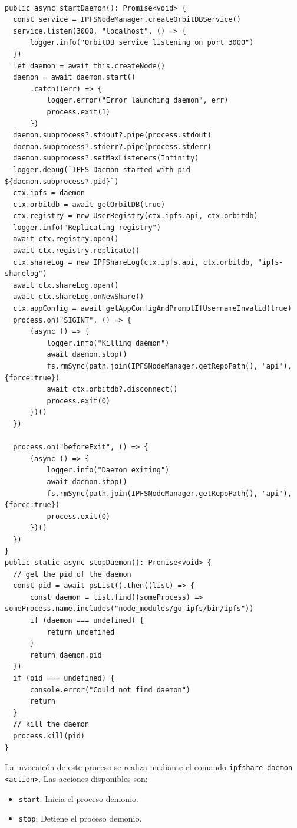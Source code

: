 \begin{verbatim}

public async startDaemon(): Promise<void> {
  const service = IPFSNodeManager.createOrbitDBService()
  service.listen(3000, "localhost", () => { 
      logger.info("OrbitDB service listening on port 3000")
  })
  let daemon = await this.createNode()
  daemon = await daemon.start()
      .catch((err) => { 
          logger.error("Error launching daemon", err) 
          process.exit(1)
      })
  daemon.subprocess?.stdout?.pipe(process.stdout)
  daemon.subprocess?.stderr?.pipe(process.stderr)
  daemon.subprocess?.setMaxListeners(Infinity)
  logger.debug(`IPFS Daemon started with pid ${daemon.subprocess?.pid}`)
  ctx.ipfs = daemon
  ctx.orbitdb = await getOrbitDB(true)
  ctx.registry = new UserRegistry(ctx.ipfs.api, ctx.orbitdb)
  logger.info("Replicating registry")
  await ctx.registry.open()
  await ctx.registry.replicate()
  ctx.shareLog = new IPFShareLog(ctx.ipfs.api, ctx.orbitdb, "ipfs-sharelog")
  await ctx.shareLog.open()
  await ctx.shareLog.onNewShare()
  ctx.appConfig = await getAppConfigAndPromptIfUsernameInvalid(true)
  process.on("SIGINT", () => {
      (async () => {
          logger.info("Killing daemon")
          await daemon.stop()
          fs.rmSync(path.join(IPFSNodeManager.getRepoPath(), "api"), {force:true})
          await ctx.orbitdb?.disconnect()
          process.exit(0)
      })()
  })

  process.on("beforeExit", () => {
      (async () => {
          logger.info("Daemon exiting")
          await daemon.stop()
          fs.rmSync(path.join(IPFSNodeManager.getRepoPath(), "api"), {force:true})
          process.exit(0)
      })()
  })
}
public static async stopDaemon(): Promise<void> {
  // get the pid of the daemon
  const pid = await psList().then((list) => {
      const daemon = list.find((someProcess) => someProcess.name.includes("node_modules/go-ipfs/bin/ipfs"))
      if (daemon === undefined) {
          return undefined 
      }
      return daemon.pid
  })
  if (pid === undefined) {
      console.error("Could not find daemon")
      return
  }
  // kill the daemon
  process.kill(pid)
}  
\end{verbatim}

La invocaicón de este proceso se realiza mediante el comando \texttt{ipfshare daemon <action>}. Las acciones disponibles son:
\begin{itemize}[noitemsep,after=\vspace{-0.4\baselineskip}]
  \item \texttt{start}: Inicia el proceso demonio.
  \item \texttt{stop}: Detiene el proceso demonio.
\end{itemize}



